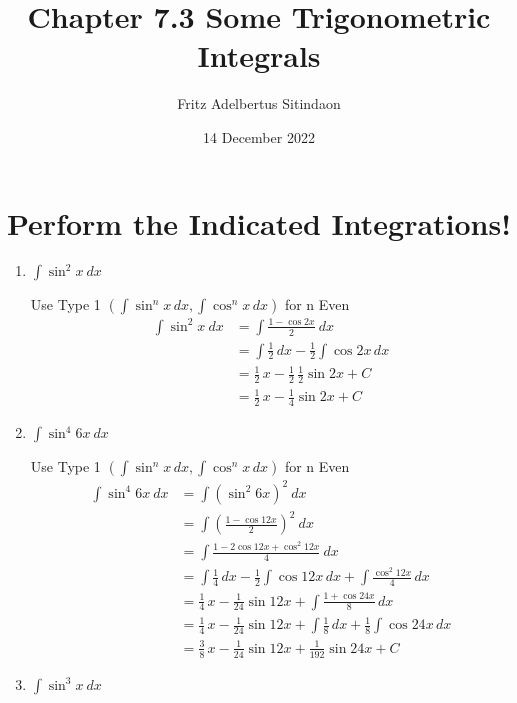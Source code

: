 \documentclass[12pt]{article}
\title{Chapter 7.3 Some Trigonometric Integrals}
\author{Fritz Adelbertus Sitindaon}
\date{14 December 2022}
\begin{document}
\maketitle

\section{Perform the Indicated Integrations!}  
  
\begin{enumerate}
\item $\displaystyle\int \sin ^2 x \ dx $

Use Type 1 $\left(\int \sin ^n x\,dx, \int \cos ^ n x\,dx\right)$ for n Even
\begin{equation*}
  \begin{aligned}
  \int \sin ^ 2 x \ dx &= \int \frac{1-\cos 2x}{2} \ dx \\
  &= \int \frac{1}{2}\,dx - \frac{1}{2}\int \cos 2x\,dx \\
  &= \frac{1}{2}\,x - \frac{1}{2}\,\frac{1}{2}\sin 2x + C \\
  &= \frac{1}{2}\,x - \frac{1}{4}\sin 2x + C
  \end{aligned}
\end{equation*}

\item $\displaystyle\int \sin ^4 6x \ dx $

Use Type 1 $\left(\int \sin ^n x\,dx, \int \cos ^ n x\,dx\right)$ for n Even
\begin{equation*}
  \begin{aligned}
  \int \sin ^4 6x \ dx &= \int (\sin ^2 6x)^2 \ dx \\
  &= \int \left(\frac{1-\cos 12x}{2}\right)^2 \ dx \\
  &= \int \frac{1-2\cos12x+\cos ^2 12x}{4} \ dx \\
  &= \int \frac{1}{4}\,dx - \frac{1}{2}\int \cos 12x\,dx + \int \frac{\cos ^2 12x}{4}\,dx\\
  &= \frac{1}{4}\,x - \frac{1}{24}\sin 12x + \int \frac{1+\cos 24x}{8}\,dx \\
  &= \frac{1}{4}\,x - \frac{1}{24}\sin 12x + \int \frac{1}{8}\,dx + \frac{1}{8}\int \cos 24x\,dx \\
  &= \frac{3}{8}\,x - \frac{1}{24}\sin 12x + \frac{1}{192}\sin 24x + C 
  \end{aligned}
\end{equation*}

\item $\displaystyle\int \sin ^3 x \ dx $


\end{enumerate}
\end{document}
